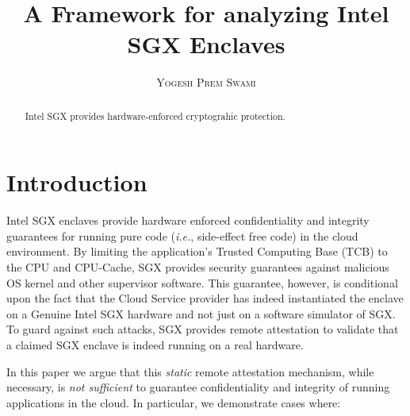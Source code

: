 \documentclass[11pt]{article}
\title{\bf A Framework for analyzing Intel SGX Enclaves}
\author{\textsc{Yogesh Prem Swami}}
\date{\lastupdate}
\begin{document}

\maketitle

\begin{abstract}
  Intel SGX provides hardware-enforced cryptograhic protection.
\end{abstract}

\section{Introduction}
    Intel SGX enclaves provide hardware enforced confidentiality and
    integrity guarantees for running pure code (\textit{i.e.},
    side-effect free code) in the cloud environment. By limiting the
    application's Trusted Computing Base (TCB) to the CPU and
    CPU-Cache, SGX provides security guarantees against malicious OS
    kernel and other supervisor software. This guarantee, however, is
    conditional upon the fact that the Cloud Service provider has
    indeed instantiated the enclave on a Genuine Intel SGX hardware
    and not just on a software simulator of SGX. To guard against such
    attacks, SGX provides remote attestation to validate that a
    claimed SGX enclave is indeed running on a real hardware.

    In this paper we argue that this \textit{static} remote
    attestation mechanism, while necessary, is \textit{not sufficient}
    to guarantee confidentiality and integrity of running applications
    in the cloud. In particular, we demonstrate cases where:
\end{document}
